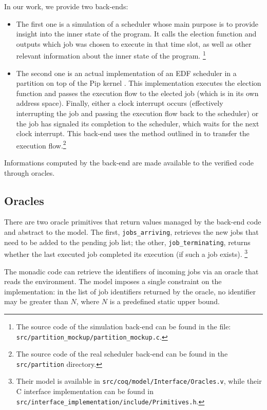	In our work, we provide two back-ends:
	\begin{itemize}
	    \item The first one  is a simulation of a scheduler whose main purpose is to provide insight into the inner state of the program. It calls the election function and outputs which job was chosen to execute in that time slot, as well as other relevant information about the inner state of the program. \footnote{The source code of the simulation back-end can be found in the file:\\ \texttt{src/partition\_mockup/partition\_mockup.c}.}
	    \item The second one is an actual implementation of an EDF scheduler in a partition on top of the Pip kernel \cite{jomaa2018proof}. This implementation executes the election function and passes the execution flow to the elected job (which is in its own address space). Finally, either a clock interrupt occurs (effectively interrupting the job and passing the execution flow back to the scheduler) or the job has signaled its completion to the scheduler, which waits for the next clock interrupt. This back-end uses the method outlined in \cite{vanhems2019proof} to transfer the execution flow.\footnote{The source code of the real scheduler back-end can be found in the \texttt{src/partition} directory.}
	\end{itemize}

	Informations computed by the back-end are made available to the verified code through oracles.

	\subsection{Oracles}

	There are two oracle primitives that return values managed by the back-end code and abstract to the model. The first, \texttt{jobs\_arriving}, retrieves the new jobs that need to be added to the pending job list; the other, \texttt{job\_terminating}, returns whether the last executed job completed its execution (if such a job exists). \footnote{Their model is available in \texttt{src/coq/model/Interface/Oracles.v}, while their C interface implementation can be found in \texttt{src/interface\_implementation/include/Primitives.h}.}

	The monadic code can retrieve the identifiers of incoming jobs via an oracle that reads the environment. The model imposes a single constraint on the implementation: in the list of job identifiers returned by the oracle, no identifier may be greater than $N$, where $N$ is a predefined static upper bound. 

